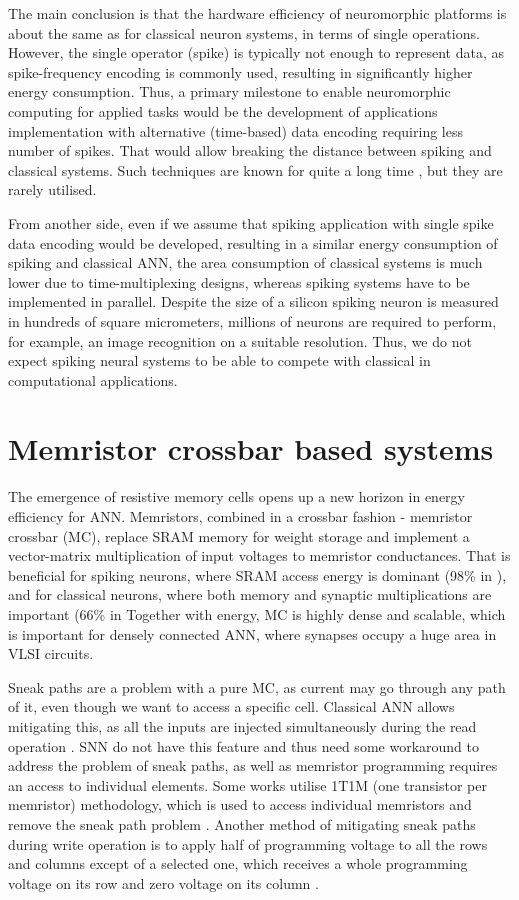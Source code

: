 \documentclass[conference, compsoc]{IEEEtran}
\begin{document}
The main conclusion is that the hardware efficiency of neuromorphic platforms is about the same as for classical neuron systems, in terms of single operations. However, the single operator (spike) is typically not enough to represent data, as spike-frequency encoding is commonly used, resulting in significantly higher energy consumption. Thus, a primary milestone to enable neuromorphic computing for applied tasks would be the development of applications implementation with alternative (time-based) data encoding requiring less number of spikes. That would allow breaking the distance between spiking and classical systems. Such techniques are known for quite a long time \cite{Thorpe:encodings}, but they are rarely utilised.

From another side, even if we assume that spiking application with single spike data encoding would be developed, resulting in a similar energy consumption of spiking and classical ANN, the area consumption of classical systems is much lower due to time-multiplexing designs, whereas spiking systems have to be implemented in parallel. Despite the size of a silicon spiking neuron is measured in hundreds of square micrometers, millions of neurons are required to perform, for example, an image recognition on a suitable resolution. Thus, we do not expect spiking neural systems to be able to compete with classical in computational applications.

\section{Memristor crossbar based systems}
The emergence of resistive memory cells opens up a new horizon in energy efficiency for ANN. Memristors, combined in a crossbar fashion - memristor crossbar (MC), replace SRAM memory for weight storage and implement a vector-matrix multiplication of input voltages to memristor conductances. That is beneficial for spiking neurons, where SRAM access energy is dominant (98\% in \cite{12p}), and for classical neurons, where both memory and synaptic multiplications are important (66\% in \cite{DianNao} Together with energy, MC is highly dense and scalable, which is important for densely connected ANN, where synapses occupy a huge area in VLSI circuits.

Sneak paths are a problem with a pure MC, as current may go through any path of it, even though we want to access a specific cell. Classical ANN allows mitigating this, as all the inputs are injected simultaneously during the read operation \cite{Memristor_approximated,RRAM_approximated}. SNN do not have this feature and thus need some workaround to address the problem of sneak paths, as well as memristor programming requires an access to individual elements. Some works utilise 1T1M (one transistor per memristor) methodology, which is used to access individual memristors and remove the sneak path problem \cite{Spiking_resistive_crossbar,STT_SNN,ex_situ}. Another method of mitigating sneak paths during write operation is to apply half of programming voltage to all the rows and columns except of a selected one, which receives a whole programming voltage on its row and zero voltage on its column \cite{RRAM_approximated,Segmented_memristor}.
\end{document}
